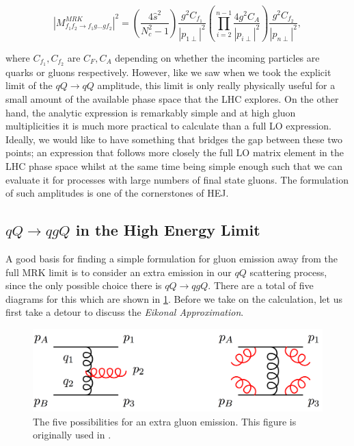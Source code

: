 \begin{equation}
|M^{MRK}_{f_1 f_2 \to f_1 g ... g f_2}|^2 = \left(\frac{4 \hat{s}^2}{N_c^2 - 1} \right) \frac{g^2 C_{f_1}}{|p_{1 \perp}|^2} \left(\prod_{i = 2}^{n-1} \frac{4 g^2 C_A}{|p_{i \perp}|^2} \right)  \frac{g^2 C_{f_2}}{|p_{n \perp}|^2} ,
\end{equation}

where $C_{f_1}, C_{f_2}$ are $C_F, C_A $ depending on whether the incoming particles are quarks or gluons respectively. However, like we saw when we took the explicit limit of the $qQ \to qQ$ amplitude, this limit is only really physically useful for a small amount of the available phase space that the LHC explores. On the other hand, the analytic expression is remarkably simple and at high gluon multiplicities it is much more practical to calculate than a full LO expression. Ideally, we would like to have something that bridges the gap between these two points; an expression that follows more closely the full LO matrix element in the LHC phase space whilst at the same time being simple enough such that we can evaluate it for processes with large numbers of final state gluons. The formulation of such amplitudes is one of the cornerstones of HEJ. 

\subsection{$qQ \to qgQ$ in the High Energy Limit}

A good basis for finding a simple formulation for gluon emission away from the full MRK limit is to consider an extra emission in our $qQ$ scattering process, since the only possible choice there is $qQ \to qgQ$. There are a total of five diagrams for this which are shown in \ref{fig:qQqgQ}. Before we take on the calculation, let us first take a detour to discuss the \emph{Eikonal Approximation}.

\begin{figure}[t]
\centering
\includegraphics[scale=0.3]{Images/gluon_emission.png} 
\caption{The five possibilities for an extra gluon emission. This figure is originally used in \cite{Andersen2009a}.}
\label{fig:qQqgQ}
\end{figure}

